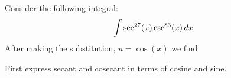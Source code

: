 \documentclass{ximera}
\author{Bart Snapp}
\begin{document}
\begin{exercise}
Consider the following integral:
  \[
  \int \sec^{27}(x)\csc^{83}(x) \mathop{}\!d x
  \]
  After making the substitution, $u = \cos(x)$ we find
  \begin{hint}
    First express secant and cosecant in terms of cosine and sine.
  \end{hint}\begin{multipleChoice}
  \end{multipleChoice}
\end{exercise}
\end{document}
